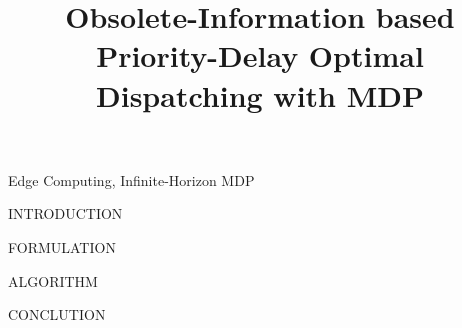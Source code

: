 \documentclass[10pt, conference, letterpaper]{IEEEtran}
\begin{document}
    \title{
        Obsolete-Information based Priority-Delay Optimal Dispatching with MDP
    }
    \author{
    }
    \maketitle

    \begin{abstract}
        \label{sec:abstract}
        \blindtext
    \end{abstract}

    \begin{IEEEkeywords}
        Edge Computing, Infinite-Horizon MDP
    \end{IEEEkeywords}

    \begin{section}{INTRODUCTION}
        \label{sec:introduction}
        \cite{sutton1998introduction}
        \blindtext
    \end{section}


    \begin{section}{FORMULATION}
        \label{sec:formulation}
        \blindtext
    \end{section}

    \begin{section}{ALGORITHM}
        \label{sec:algorithm}
        \blindtext
    \end{section}

    \begin{section}{CONCLUTION}
        \label{sec:conclusion}
    \end{section}

    
    
\end{document}
